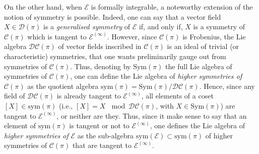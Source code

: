 \documentclass[12pt,english]{elsarticle}
\theoremstyle{plain}
\theoremstyle{plain}
\theoremstyle{remark}
\theoremstyle{plain}
\theoremstyle{definition}
\theoremstyle{definition}
\begin{document}
On the other hand, when $\mathcal{E}$ is formally integrable, a noteworthy
extension of the notion of symmetry is possible. Indeed, one can say that
a vector field $X\in \mathcal{D}(\pi )$ is a
\textit{generalised symmetry} of $\mathcal{E}$ if, and only if, $X$ is a
symmetry of $\mathcal{C}(\pi )$ which is tangent to
$\mathcal{E}^{(\infty )}$. However, since $\mathcal{C}(\pi )$ is Frobenius,
the Lie algebra $\mathcal{DC}(\pi )$ of vector fields inscribed in
$\mathcal{C}(\pi )$ is an ideal of trivial (or characteristic) symmetries,
that one wants preliminarily gauge out from symmetries of
$\mathcal{C}(\pi )$. Thus, denoting by $\text{Sym}(\pi )$ the full Lie algebra
of symmetries of $\mathcal{C}(\pi )$, one can define the Lie algebra of
\textit{higher symmetries of} $\mathcal{C}(\pi )$ as the quotient algebra
$\text{sym}(\pi )=\text{Sym}(\pi )/\mathcal{DC}(\pi )$. Hence, since any
field of $\mathcal{DC}(\pi )$ is already tangent to
$\mathcal{E}^{(\infty )}$, all elements of a coset
$\left [X\right ]\in \text{sym}(\pi )$ (i.e.,
$\left [X\right ]=X\,\mod{\mathcal{DC}(\pi )}$, with
$X\in \text{Sym}(\pi )$) are tangent to $\mathcal{E}^{(\infty )}$, or neither
are they. Thus, since it make sense to say that an element of
$\text{sym}(\pi )$ is tangent or not to $\mathcal{E}^{(\infty )}$, one defines
the Lie algebra of \textit{higher symmetries of} $\mathcal{E}$ as the sub-algebra
$\text{sym}(\mathcal{E})\subset \text{sym}(\pi )$ of higher symmetries of
$\mathcal{C}(\pi )$ that are tangent to $\mathcal{E}^{(\infty )}$.
\end{document}
